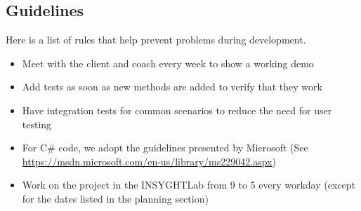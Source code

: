 \subsection{Guidelines}

Here is a list of rules that help prevent problems during development.

\begin{itemize}
	\item Meet with the client and coach every week to show a working demo
	\item Add tests as soon as new methods are added to verify that they work
	\item Have integration tests for common scenarios to reduce the need for user testing
	\item For C\# code, we adopt the guidelines presented by Microsoft
		  (See \url{https://msdn.microsoft.com/en-us/library/ms229042.aspx})
	\item Work on the project in the INSYGHTLab from 9 to 5 every workday (except for the dates listed in the planning section)
\end{itemize}
